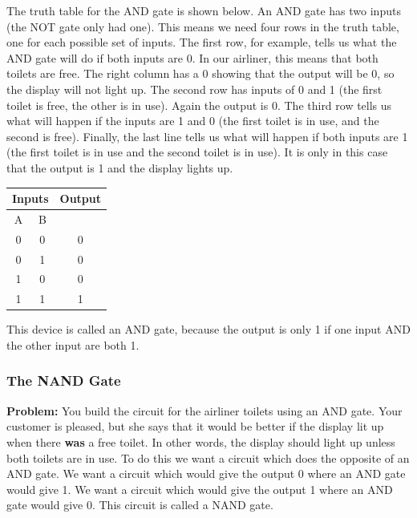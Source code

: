 The truth table for the AND gate is shown below.  An AND gate has two inputs (the NOT gate only had one).  This means we need four rows in the truth table, one for each possible set of inputs.  The first row, for example, tells us what the AND gate will do if both inputs are 0.  In our airliner, this means that both toilets are free.  The right column has a 0 showing that the output will be 0, so the display will not light up.  The second row has inputs of 0 and 1 (the first toilet is free, the other is in use).  Again the output is 0.  The third row tells us what will happen if the inputs are 1 and 0 (the first toilet is in use, and the second is free).  Finally, the last line tells us what will happen if both inputs are 1 (the first toilet is in use and the second toilet is in use).  It is only in this case that the output is 1 and the display lights up.

\begin{center}
\begin{tabular}{|c|c|c|}\hline
\multicolumn{2}{|c|}{\textbf{Inputs}} & \textbf{Output}\\\hline
A&B& \\\hline\hline
0&0&0\\\hline
0&1&0\\\hline
1&0&0\\\hline
1&1&1\\\hline
\end{tabular}
\end{center}

This device is called an AND gate, because the output is only 1 if one input AND the other input are both 1.


\clearpage


\subsubsection{The NAND Gate}
{\bf Problem:} You build the circuit for the airliner toilets using an AND gate.  Your customer is pleased, but she says that it would be better if the display lit up when there {\bf was} a free toilet.  In other words, the display should light up unless both toilets are in use.  To do this we want a circuit which does the opposite of an AND gate.  We want a circuit which would give the output 0 where an AND gate would give 1.  We want a circuit which would give the output 1 where an AND gate would give 0.  This circuit is called a NAND gate.

